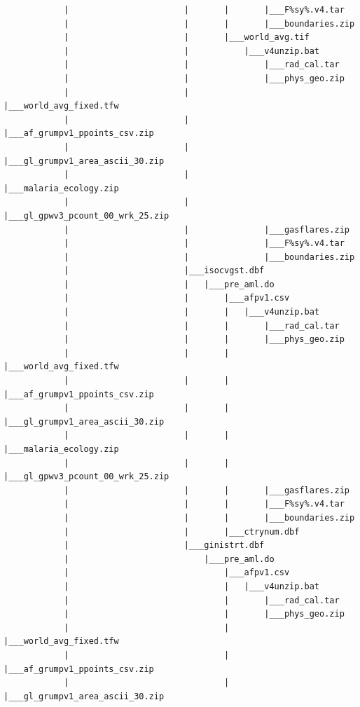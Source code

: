 \documentclass[]{book}
\begin{document}
\begin{verbatim}
            |                       |       |       |___F%sy%.v4.tar
            |                       |       |       |___boundaries.zip
            |                       |       |___world_avg.tif
            |                       |           |___v4unzip.bat
            |                       |               |___rad_cal.tar
            |                       |               |___phys_geo.zip
            |                       |               |___world_avg_fixed.tfw
            |                       |               |___af_grumpv1_ppoints_csv.zip
            |                       |               |___gl_grumpv1_area_ascii_30.zip
            |                       |               |___malaria_ecology.zip
            |                       |               |___gl_gpwv3_pcount_00_wrk_25.zip
            |                       |               |___gasflares.zip
            |                       |               |___F%sy%.v4.tar
            |                       |               |___boundaries.zip
            |                       |___isocvgst.dbf
            |                       |   |___pre_aml.do
            |                       |       |___afpv1.csv
            |                       |       |   |___v4unzip.bat
            |                       |       |       |___rad_cal.tar
            |                       |       |       |___phys_geo.zip
            |                       |       |       |___world_avg_fixed.tfw
            |                       |       |       |___af_grumpv1_ppoints_csv.zip
            |                       |       |       |___gl_grumpv1_area_ascii_30.zip
            |                       |       |       |___malaria_ecology.zip
            |                       |       |       |___gl_gpwv3_pcount_00_wrk_25.zip
            |                       |       |       |___gasflares.zip
            |                       |       |       |___F%sy%.v4.tar
            |                       |       |       |___boundaries.zip
            |                       |       |___ctrynum.dbf
            |                       |___ginistrt.dbf
            |                           |___pre_aml.do
            |                               |___afpv1.csv
            |                               |   |___v4unzip.bat
            |                               |       |___rad_cal.tar
            |                               |       |___phys_geo.zip
            |                               |       |___world_avg_fixed.tfw
            |                               |       |___af_grumpv1_ppoints_csv.zip
            |                               |       |___gl_grumpv1_area_ascii_30.zip

\end{verbatim}
\end{document}
